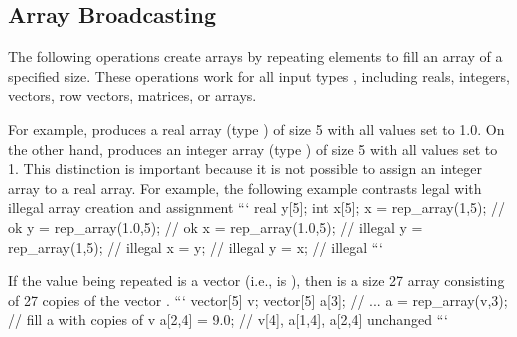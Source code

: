 \begin{description}
\begin{description}
\begin{description}
\begin{description}
\begin{description}
\begin{description}
\begin{description}
\begin{description}
\begin{description}
\begin{description}
\begin{description}
\begin{description}
\begin{description}
\begin{description}
\begin{description}
\begin{description}
\begin{description}
\begin{description}
\begin{description}
\begin{description}
\begin{description}
\begin{description}
\begin{description}
\begin{description}
\begin{description}
\begin{description}
\begin{description}
\begin{description}
\begin{description}
\begin{description}
\section{Array Broadcasting}

The following operations create arrays by repeating elements to fill an array of a specified size.  These operations work for all input types , including reals, integers, vectors, row vectors, matrices, or arrays.

\begin{description}  %

For example,  produces a real array (type ) of size 5 with all values set to 1.0.  On the other hand,  produces an integer array (type ) of size 5 with all values set to 1.  This distinction is important because it is not possible to assign an integer array to a real array.  For example, the following example contrasts legal with illegal array creation and assignment
```
real y[5];
int x[5];
x = rep_array(1,5); // ok
y = rep_array(1.0,5);  // ok
x = rep_array(1.0,5);  // illegal
y = rep_array(1,5);     // illegal 
x = y;                  // illegal
y = x;                  // illegal 
```

If the value being repeated  is a vector (i.e.,  is ), then  is a size 27 array consisting of 27 copies of the vector .
```
vector[5] v;
vector[5] a[3];
// ... 
a = rep_array(v,3);  // fill a with copies of v 
a[2,4] = 9.0;        // v[4], a[1,4], a[2,4] unchanged 
```


\end{description}
\end{description}
\end{description}
\end{description}
\end{description}
\end{description}
\end{description}
\end{description}
\end{description}
\end{description}
\end{description}
\end{description}
\end{description}
\end{description}
\end{description}
\end{description}
\end{description}
\end{description}
\end{description}
\end{description}
\end{description}
\end{description}
\end{description}
\end{description}
\end{description}
\end{description}
\end{description}
\end{description}
\end{description}
\end{description}
\end{description}
